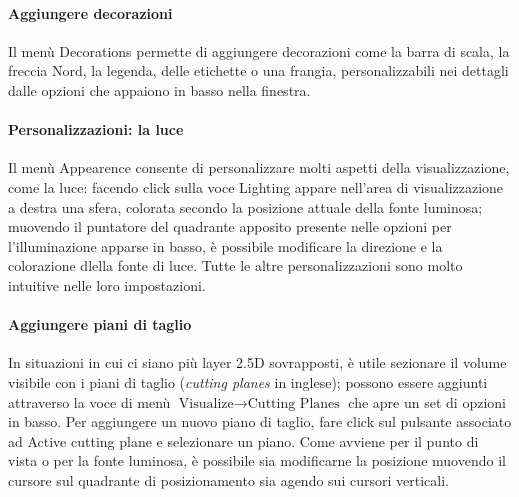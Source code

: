 			\paragraph{Aggiungere decorazioni}
				Il menù \textsf{Decorations} permette di aggiungere decorazioni come la barra di scala, la freccia Nord, la legenda, delle etichette o una frangia, personalizzabili nei dettagli dalle opzioni che appaiono in basso nella finestra.

			\paragraph{Personalizzazioni: la luce}
				Il menù \textsf{Appearence} consente di personalizzare molti aspetti della visualizzazione, come la luce: facendo click sulla voce \textsf{Lighting} appare nell'area di visualizzazione a destra una sfera, colorata secondo la posizione attuale della fonte luminosa; muovendo il puntatore del quadrante apposito presente nelle opzioni per l'illuminazione apparse in basso, è possibile modificare la direzione e la colorazione dlella fonte di luce. Tutte le altre personalizzazioni sono molto intuitive nelle loro impostazioni.

			\paragraph{Aggiungere piani di taglio}
				In situazioni in cui ci siano più layer 2.5D sovrapposti, è utile sezionare il volume visibile con i piani di taglio (\emph{cutting planes} in inglese); possono essere aggiunti attraverso la voce di menù \textsf{$\text{Visualize}\rightarrow\text{Cutting Planes}$} che apre un set di opzioni in basso. Per aggiungere un nuovo piano di taglio, fare click sul pulsante associato ad \textsf{Active cutting plane} e selezionare un piano. Come avviene per il punto di vista o per la fonte luminosa, è possibile sia modificarne la posizione muovendo il cursore sul quadrante di posizionamento sia agendo sui cursori verticali.


